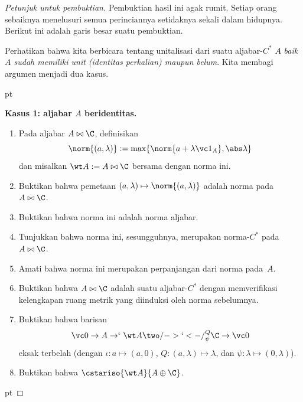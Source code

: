 \begin{proof}[\emph{Petunjuk untuk pembuktian}] Pembuktian hasil ini agak rumit. Setiap orang
sebaiknya menelusuri semua perinciannya setidaknya sekali dalam hidupnya. Berikut ini
adalah garis besar suatu pembuktian.

Perhatikan bahwa kita berbicara tentang unitalisasi dari suatu aljabar-$C^*$ $A$
\emph{baik $A$ sudah memiliki unit (identitas perkalian) maupun belum}. Kita membagi
argumen menjadi dua kasus.

 pt

\noindent\textbf{Kasus 1: aljabar $A$ beridentitas.}
\begin{enumerate}
    \item Pada aljabar $A \bowtie \C$, definisikan
       \[ \norm{(a,\lambda)} := \max\{\norm{a + \lambda \vc 1_A}, \abs\lambda\} \]
dan misalkan $\wt A := A \bowtie \C$ bersama dengan norma ini.
    \item Buktikan bahwa pemetaan $(a,\lambda) \mapsto \norm{(a,\lambda)}$ adalah norma
pada~$A \bowtie \C$.
    \item Buktikan bahwa norma ini adalah norma aljabar.
    \item Tunjukkan bahwa norma ini, sesungguhnya, merupakan norma-$C^*$ pada
$A \bowtie \C$.
    \item Amati bahwa norma ini merupakan perpanjangan dari norma pada~$A$.
    \item Buktikan bahwa $A \bowtie \C$ adalah suatu aljabar-$C^*$ dengan memverifikasi
kelengkapan ruang metrik yang diinduksi oleh norma sebelumnya.
    \item Buktikan bahwa barisan
       \[ \vc 0 \to A \to^\iota \wt A \two/->`<-/^Q_\psi \C \to \vc 0  \]
eksak terbelah (dengan $\iota\colon a \mapsto (a,0)$, $Q\colon (a,\lambda) \mapsto
\lambda$, dan $\psi\colon \lambda \mapsto (0,\lambda)$).
    \item Buktikan bahwa $\cstariso{\wt A}{A \oplus \C}$.
\end{enumerate}

 pt


\end{proof}
